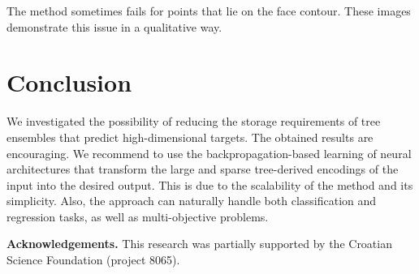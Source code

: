 \documentclass{article}
\begin{document}
		The method sometimes fails for points that lie on the face contour.
		These images demonstrate this issue in a qualitative way.

\section{Conclusion}
	We investigated the possibility of reducing the storage requirements of tree ensembles that predict high-dimensional targets.
	The obtained results are encouraging.
	We recommend to use the backpropagation-based learning of neural architectures that transform the large and sparse tree-derived encodings of the input into the desired output.
	This is due to the scalability of the method and its simplicity.
	Also, the approach can naturally handle both classification and regression tasks, as well as multi-objective problems.

	\textbf{Acknowledgements.}
	This research was partially supported by the Croatian Science Foundation (project 8065).

\clearpage
\fontsize{10pt}{11pt}\selectfont


\end{document}

